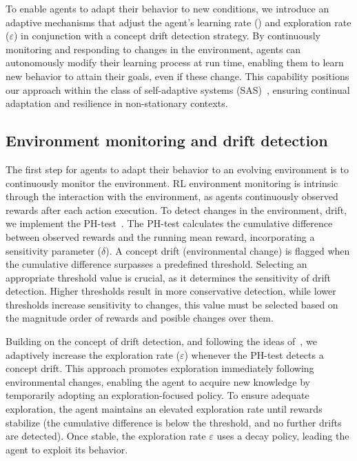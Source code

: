 To enable agents to adapt their behavior to new conditions, we introduce an adaptive mechanisms 
that adjust the agent's learning rate (\lrate{\alpha}) and exploration rate ($\varepsilon$) in conjunction 
with a concept drift detection strategy. By continuously monitoring and responding to changes in the 
environment, agents can autonomously modify their learning process at run time, enabling them 
to learn new behavior to attain their goals, even if these change. This capability positions our 
approach within the class of self-adaptive systems (SAS)~\cite{sasreview}, ensuring continual 
adaptation and resilience in non-stationary contexts.

\subsection{Environment monitoring and drift detection}

The first step for agents to adapt their behavior to an evolving environment is to continuously monitor 
the environment. \ac{RL} environment monitoring is intrinsic through the interaction with the 
environment, as agents continuously observed rewards after each action execution. To detect 
changes in the environment, \ie drift, we implement the 
PH-test~\cite{mignon2017adaptive,networkdynamicrl}. The PH-test calculates the cumulative 
difference between observed rewards and the running mean reward, incorporating a sensitivity 
parameter ($\delta$). A concept drift (environmental change) is flagged when the cumulative 
difference surpasses a predefined threshold. Selecting an appropriate threshold value is crucial, as it 
determines the sensitivity of drift detection. Higher thresholds result in more conservative detection, 
while lower thresholds increase sensitivity to changes, this value must be selected based on the 
magnitude order of rewards and posible changes over them.

Building on the concept of drift detection, and following the ideas of~\citet{mignon2017adaptive}, 
we adaptively increase the exploration rate ($\varepsilon$) whenever the PH-test detects a concept 
drift. This approach promotes exploration immediately following environmental changes, enabling 
the agent to acquire new knowledge by temporarily adopting an exploration-focused policy. To 
ensure adequate exploration, the agent maintains an elevated exploration rate until rewards 
stabilize (\ie the cumulative difference is below the threshold, and  no further drifts are detected). 
Once stable, the exploration rate $\varepsilon$ uses a decay policy, leading the agent to exploit its 
behavior.

